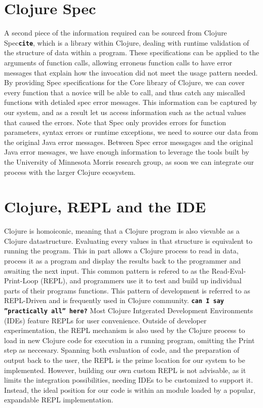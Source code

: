 \documentclass[12pt]{article}
\newcommand{\comment}[1]{{\bf \tt  {#1}}}
\begin{document}
\section{Clojure Spec}
A second piece of the information required can be sourced from Clojure Spec\comment{cite},
which is a library within Clojure, dealing with runtime validation of
the structure of data within a program. These specifications can be applied to
 the arguments of function calls, allowing erroneus function calls to have
 error messages that explain how the invocation did not meet the usage pattern
 needed. By providing Spec specifications for the Core library of Clojure,
 we can cover every function that a novice will be able to call, and thus catch
 any miscalled functions with detialed spec error messages.
 This information can be captured by our system, and as a result
 let us access information such as the actual values that caused the errors.
Note that Spec only provides errors for function parameters, syntax errors or
runtime exceptions, we need to source our data from the original Java error messages.
Between Spec error messgages and the original Java error messages, we have enough
information to leverage the tools built by the
 University of Minnesota Morris research group, as soon we can integrate
 our process with the larger Clojure ecosystem.

\section{Clojure, REPL and the IDE}
Clojure is homoiconic, meaning that a Clojure program is also
vievable as a Clojure datastructure. Evaluating every values in that structure is
equivalent to running the program.
This in part allows a Clojure process to read in data, process it as a program
and display the results back to the programmer and awaiting the next input.
 This common pattern is refered to
as the Read-Eval-Print-Loop (REPL), and programmers use it to test and build up
individual parts of their programs functions. This pattern of development is
referred to as REPL-Driven and is frequently used in Clojure community.
\comment{can I say ''practically all'' here?}
 Most Clojure Intgerated Development Environments (IDEs) feature REPLs for
 user convenience. Outside of developer experimentation, the REPL mechanism is also used
by the Clojure process to load in new Clojure code for execution in a running program,
omitting the Print step as neccesary.
Spanning both evaluation of code, and the preparation of output back to the user,
the REPL is the prime location for our system to be implemented.
However, building our own custom REPL is not advisable, as it limits the
integration possibilities, needing IDEs to be customized to support it.
Instead, the ideal position for our code is within an module loaded
by a popular, expandable REPL implementation.
\end{document}

